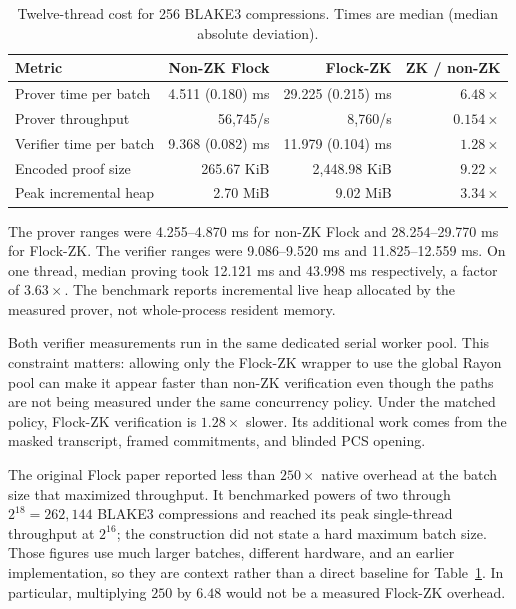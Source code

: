 \documentclass[11pt]{article}
\theoremstyle{definition}
\begin{document}
\begin{table}[ht]
\centering\small
\caption{Twelve-thread cost for 256 BLAKE3 compressions.  Times are median
(median absolute deviation).}
\label{tab:performance}
\begin{tabular}{@{}lrrr@{}}
\toprule
Metric & Non-ZK Flock & Flock-ZK & ZK / non-ZK \\
\midrule
Prover time per batch & 4.511 (0.180) ms & 29.225 (0.215) ms & $6.48\times$ \\
Prover throughput & 56,745/s & 8,760/s & $0.154\times$ \\
Verifier time per batch & 9.368 (0.082) ms & 11.979 (0.104) ms & $1.28\times$ \\
Encoded proof size & 265.67 KiB & 2,448.98 KiB & $9.22\times$ \\
Peak incremental heap & 2.70 MiB & 9.02 MiB & $3.34\times$ \\
\bottomrule
\end{tabular}
\end{table}

The prover ranges were 4.255--4.870 ms for non-ZK Flock and 28.254--29.770 ms
for Flock-ZK.  The verifier ranges were 9.086--9.520 ms and 11.825--12.559 ms.
On one thread, median proving took 12.121 ms and 43.998 ms respectively, a
factor of $3.63\times$.  The benchmark reports incremental live heap allocated
by the measured prover, not whole-process resident memory.

Both verifier measurements run in the same dedicated serial worker pool.  This
constraint matters: allowing only the Flock-ZK wrapper to use the global Rayon
pool can make it appear faster than non-ZK verification even though the paths
are not being measured under the same concurrency policy.  Under the matched
policy, Flock-ZK verification is $1.28\times$ slower.  Its additional work
comes from the masked transcript, framed commitments, and blinded PCS opening.

The original Flock paper \cite{Flock} reported less than $250\times$ native
overhead at the batch size that maximized throughput.  It benchmarked powers
of two through
$2^{18}=262{,}144$ BLAKE3 compressions and reached its peak single-thread
throughput at $2^{16}$; the construction did not state a hard maximum batch
size.  Those figures use much larger batches, different hardware, and an
earlier implementation, so they are context rather than a direct baseline for
Table~\ref{tab:performance}.  In particular, multiplying $250$ by $6.48$ would
not be a measured Flock-ZK overhead.
\end{document}
